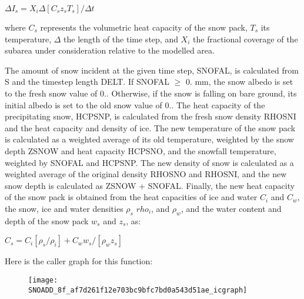 $\Delta I_s = X_i \Delta [C_s z_s T_s] / \Delta t$

where $C_s$ represents the volumetric heat capacity of the snow pack, $T_s$ its temperature, $\Delta$ the length of the time step, and $X_i$ the fractional coverage of the subarea under consideration relative to the modelled area.

The amount of snow incident at the given time step, S\+N\+O\+F\+A\+L, is calculated from S and the timestep length D\+E\+L\+T. If S\+N\+O\+F\+A\+L $\geq$ 0. mm, the snow albedo is set to the fresh snow value of 0.. Otherwise, if the snow is falling on bare ground, its initial albedo is set to the old snow value of 0.. The heat capacity of the precipitating snow, H\+C\+P\+S\+N\+P, is calculated from the fresh snow density R\+H\+O\+S\+N\+I and the heat capacity and density of ice. The new temperature of the snow pack is calculated as a weighted average of its old temperature, weighted by the snow depth Z\+S\+N\+O\+W and heat capacity H\+C\+P\+S\+N\+O, and the snowfall temperature, weighted by S\+N\+O\+F\+A\+L and H\+C\+P\+S\+N\+P. The new density of snow is calculated as a weighted average of the original density R\+H\+O\+S\+N\+O and R\+H\+O\+S\+N\+I, and the new snow depth is calculated as Z\+S\+N\+O\+W + S\+N\+O\+F\+A\+L. Finally, the new heat capacity of the snow pack is obtained from the heat capacities of ice and water $C_i$ and $C_w$, the snow, ice and water densities $\rho_s$ $rho_i$, and $\rho_w$, and the water content and depth of the snow pack $w_s$ and $z_s$, as\+:

$C_s = C_i [ \rho_s /\rho_i ] + C_w w_s /[\rho_w z_s]$

Here is the caller graph for this function\+:\nopagebreak
\begin{figure}[H]
\begin{center}
\leavevmode
\texttt{[image: SNOADD\_8f\_af7d261f12e703bc9bfc7bd0a543d51ae\_icgraph]}
\end{center}
\end{figure}


